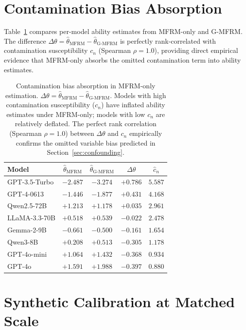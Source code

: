 \section{Contamination Bias Absorption}
\label{app:bias_absorption}

Table~\ref{tab:bias_absorption} compares per-model ability estimates from MFRM-only and G-MFRM. The difference $\Delta\theta = \hat{\theta}_{\text{MFRM}} - \hat{\theta}_{\text{G-MFRM}}$ is perfectly rank-correlated with contamination susceptibility $c_n$ (Spearman $\rho = 1.0$), providing direct empirical evidence that MFRM-only absorbs the omitted contamination term into ability estimates.

\begin{table}[h]
\centering
\scriptsize
\setlength{\tabcolsep}{3pt}
\begin{tabular}{lcccc}
\toprule
\textbf{Model} & $\hat{\theta}_{\text{MFRM}}$ & $\hat{\theta}_{\text{G-MFRM}}$ & $\Delta\theta$ & $\hat{c}_n$ \\
\midrule
GPT-3.5-Turbo & $-2.487$ & $-3.274$ & $+0.786$ & $5.587$ \\
GPT-4-0613 & $-1.446$ & $-1.877$ & $+0.431$ & $4.168$ \\
Qwen2.5-72B & $+1.213$ & $+1.178$ & $+0.035$ & $2.961$ \\
LLaMA-3.3-70B & $+0.518$ & $+0.539$ & $-0.022$ & $2.478$ \\
Gemma-2-9B & $-0.661$ & $-0.500$ & $-0.161$ & $1.654$ \\
Qwen3-8B & $+0.208$ & $+0.513$ & $-0.305$ & $1.178$ \\
GPT-4o-mini & $+1.064$ & $+1.432$ & $-0.368$ & $0.934$ \\
GPT-4o & $+1.591$ & $+1.988$ & $-0.397$ & $0.880$ \\
\bottomrule
\end{tabular}
\caption{Contamination bias absorption in MFRM-only estimation. $\Delta\theta = \hat{\theta}_{\text{MFRM}} - \hat{\theta}_{\text{G-MFRM}}$. Models with high contamination susceptibility ($c_n$) have inflated ability estimates under MFRM-only; models with low $c_n$ are relatively deflated. The perfect rank correlation (Spearman $\rho = 1.0$) between $\Delta\theta$ and $c_n$ empirically confirms the omitted variable bias predicted in Section~\ref{sec:confounding}.}
\label{tab:bias_absorption}
\end{table}


\section{Synthetic Calibration at Matched Scale}
\label{app:synthetic_calibration}

